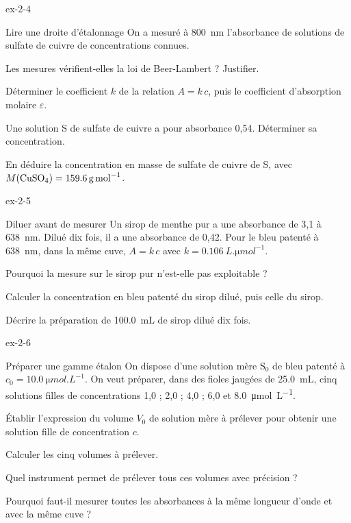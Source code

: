\begin{blocLivre}{ex-2-4}
\begin{exercice}[1]{Lire une droite d'étalonnage}
On a mesuré à \qty{800}{nm} l'absorbance de solutions de sulfate de cuivre de concentrations connues.
\begin{questions}
\item Les mesures vérifient-elles la loi de Beer-Lambert ? Justifier.
\item Déterminer le coefficient $k$ de la relation $A=k\,c$, puis le coefficient d'absorption molaire $\varepsilon$.
\item Une solution S de sulfate de cuivre a pour absorbance 0,54. Déterminer sa concentration.
\item En déduire la concentration en masse de sulfate de cuivre de S, avec $M(\ce{CuSO4})=\qty{159,6}{g.mol^{-1}}$.
\end{questions}
\end{exercice}
\end{blocLivre}
\begin{blocLivre}{ex-2-5}
\begin{exercice}[1]{Diluer avant de mesurer}
Un sirop de menthe pur a une absorbance de 3,1 à \qty{638}{nm}. Dilué dix fois, il a une absorbance de 0,42. Pour le bleu
patenté à \qty{638}{nm}, dans la même cuve, $A=k\,c$ avec $k=\qty{0,106}{L.\micro mol^{-1}}$.
\begin{questions}
\item Pourquoi la mesure sur le sirop pur n'est-elle pas exploitable ?
\item Calculer la concentration en bleu patenté du sirop dilué, puis celle du sirop.
\item Décrire la préparation de \qty{100,0}{mL} de sirop dilué dix fois.
\end{questions}
\end{exercice}
\end{blocLivre}
\begin{blocLivre}{ex-2-6}
\begin{exercice}[2]{Préparer une gamme étalon}
On dispose d'une solution mère S$_0$ de bleu patenté à $c_0=\qty{10,0}{\micro mol.L^{-1}}$. On veut préparer, dans des fioles jaugées de
\qty{25,0}{mL}, cinq solutions filles de concentrations 1,0 ; 2,0 ; 4,0 ; 6,0 et \qty{8,0}{\micro mol.L^{-1}}.
\begin{questions}
\item Établir l'expression du volume $V_0$ de solution mère à prélever pour obtenir une solution fille de concentration $c$.
\item Calculer les cinq volumes à prélever.
\item Quel instrument permet de prélever tous ces volumes avec précision ?
\item Pourquoi faut-il mesurer toutes les absorbances à la même longueur d'onde et avec la même cuve ?
\end{questions}
\end{exercice}
\end{blocLivre}
